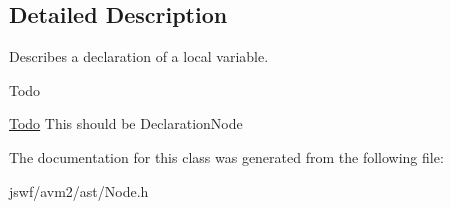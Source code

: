 \subsection{Detailed Description}
Describes a declaration of a local variable. 

\begin{DoxyRefDesc}{Todo}
\item[\hyperlink{todo__todo000006}{Todo}]This should be {\ttfamily Declaration\+Node} \end{DoxyRefDesc}


The documentation for this class was generated from the following file\+:\begin{DoxyCompactItemize}
\item 
jswf/avm2/ast/Node.\+h\end{DoxyCompactItemize}
